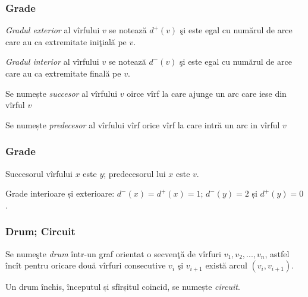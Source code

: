 \begin{frame}
  \frametitle{Grade}

\emph{Gradul exterior} al vîrfului $v$ se notează $d^+(v)$ şi este egal cu numărul de arce care au ca extremitate iniţială pe $v$.

\emph{Gradul interior} al vîrfului $v$ se notează $d^-(v)$ şi este egal cu numărul de arce care au ca extremitate finală pe $v$.

Se numește \emph{succesor} al vîrfului $v$ oirce vîrf la care ajunge un arc care iese din vîrful $v$

Se numește \emph{predecesor} al vîrfului vîrf orice vîrf la care intră un arc  in vîrful $v$ 

\end{frame}

\begin{frame}
  \frametitle{Grade}

\begin{figure}
\centering%
%
\end{figure}

Succesorul vîrfului $x$ este $y$; predecesorul lui $x$ este $v$.

Grade interioare și exterioare: $d^-(x)=d^+(x)=1$; $d^-(y)=2$ și $d^+(y)=0$.

\end{frame}


\begin{frame}
  \frametitle{Drum; Circuit}

Se numeşte \emph{drum} într-un graf orientat o secvenţă de vîrfuri $v_1,v_2,...,v_n$, astfel încît pentru oricare două vîrfuri consecutive $v_i$ şi $v_{i+1}$ există arcul $(v_i,v_{i+1})$. 

Un drum închis, începutul și sfîrșitul coincid, se numește \emph{circuit}. 

\end{frame}

